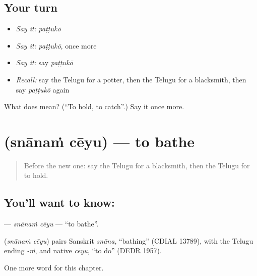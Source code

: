 \subsection*{Your turn}
\begin{itemize}
\raggedright
  \item \emph{Say it:} \emph{paṭṭukō}
  \item \emph{Say it:} \emph{paṭṭukō}, once more
  \item \emph{Say it:} say \emph{paṭṭukō}
  \item \emph{Recall:} say the Telugu for a potter, then the Telugu for a blacksmith, then say \emph{paṭṭukō} again
\end{itemize}

\begin{tcolorbox}[breakable,colback=teal!4,colframe=teal!35!black,title={Before you move on}]
What does  mean? (\textquotedblleft{}To hold, to catch\textquotedblright{}.) Say it once more.
\end{tcolorbox}
\section[\texorpdfstring{\te{స్నానం} \te{చేయు} (snānaṁ cēyu)}{స్నానం చేయు (snānaṁ cēyu)}]{  (snānaṁ cēyu) — to bathe}

\label{lesson:TE-C278-snanam-ceyu}



\begin{quote}
Before the new one: say the Telugu for a blacksmith, then the Telugu for to hold.
\end{quote}

\subsection*{You'll want to know:  }
\textbf{ } — \emph{snānaṁ cēyu} — \textquotedblleft{}to bathe\textquotedblright{}.

\begin{cousinweb}
\textbf{ } (\emph{snānaṁ cēyu}) pairs Sanskrit \emph{snāna}, \textquotedblleft{}bathing\textquotedblright{} (CDIAL 13789), with the Telugu ending \emph{-ṁ}, and native \emph{cēyu}, \textquotedblleft{}to do\textquotedblright{} (DEDR 1957).
\end{cousinweb}

\begin{grammarlens}[title={What you've built}]
One more word for this chapter.
\end{grammarlens}

